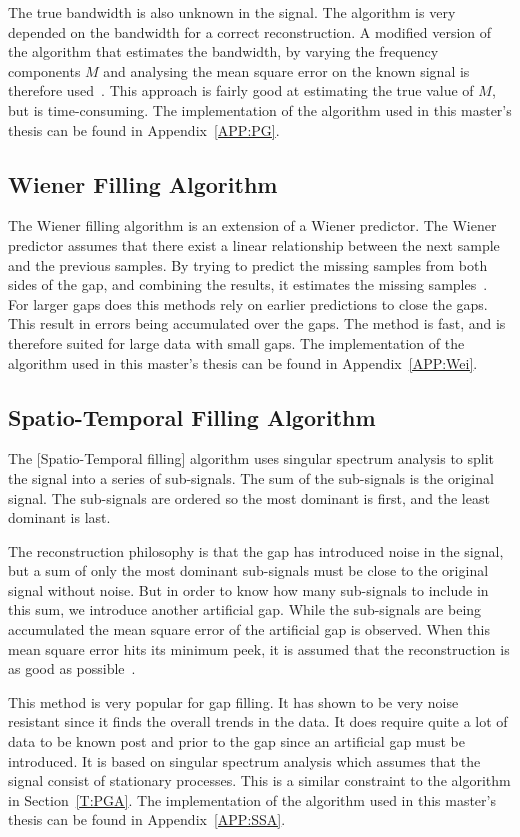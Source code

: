 The true bandwidth is also unknown in the signal. The  algorithm is very depended on the bandwidth for a correct reconstruction. A modified version of the algorithm that estimates the bandwidth, by varying the frequency components $M$ and analysing the mean square error on the known signal is therefore used~\cite{RefWorks:13}. This approach is fairly good at estimating the true value of $M$, but is time-consuming. The implementation of the algorithm used in this master's thesis can be found in Appendix~\ref{APP:PG}.

\subsection{Wiener Filling Algorithm}
The Wiener filling algorithm is an extension of a Wiener predictor. The Wiener predictor assumes that there exist a linear relationship between the next sample and the previous samples. By trying to predict the missing samples from both sides of the gap, and combining the results, it estimates the missing samples~\citep{RefWorks:14}. For larger gaps does this methods rely on earlier predictions to close the gaps. This result in errors being accumulated over the gaps. The method is fast, and is therefore suited for large data with small gaps. The implementation of the algorithm used in this master's thesis can be found in Appendix~\ref{APP:Wei}.

\subsection{Spatio-Temporal Filling Algorithm}
The [Spatio-Temporal filling] algorithm uses singular spectrum analysis to split the signal into a series of sub-signals. The sum of the sub-signals is the original signal. The sub-signals are ordered so the most dominant is first, and the least dominant is last. 

The reconstruction philosophy is that the gap has introduced noise in the signal, but a sum of only the most dominant sub-signals must be close to the original signal without noise. But in order to know how many sub-signals to include in this sum, we introduce another artificial gap. While the sub-signals are being accumulated the mean square error of the artificial gap is observed. When this mean square error hits its minimum peek, it is assumed that the reconstruction is as good as possible~\cite{RefWorks:15}.

This method is very popular for gap filling. It has shown to be very noise resistant since it finds the overall trends in the data. It does require quite a lot of data to be known post and prior to the gap since an artificial gap must be introduced. It is based on singular spectrum analysis which assumes that the signal consist of stationary processes. This is a similar constraint to the  algorithm in Section~\ref{T:PGA}. The implementation of the algorithm used in this master's thesis can be found in Appendix~\ref{APP:SSA}.

